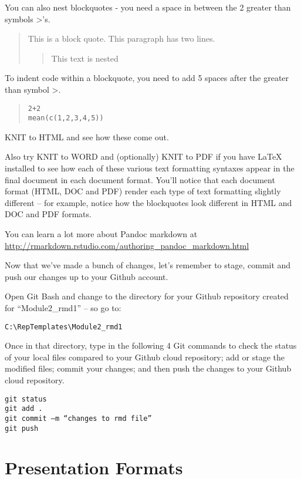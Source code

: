 \documentclass[
]{book}
\begin{document}
You can also nest blockquotes - you need a space in between the 2 greater than symbols \textgreater's.

\begin{quote}
This is a block quote. This
paragraph has two lines.

\begin{quote}
This text is nested
\end{quote}
\end{quote}

To indent code within a blockquote, you need to add 5 spaces after the greater than symbol \textgreater.

\begin{quote}
\begin{verbatim}
2+2
mean(c(1,2,3,4,5))
\end{verbatim}
\end{quote}

KNIT to HTML and see how these come out.

Also try KNIT to WORD and (optionally) KNIT to PDF if you have LaTeX installed to see how each of these various text formatting syntaxes appear in the final document in each document format. You'll notice that each document format (HTML, DOC and PDF) render each type of text formatting slightly different -- for example, notice how the blockquotes look different in HTML and DOC and PDF formats.

You can learn a lot more about Pandoc markdown at \url{http://rmarkdown.rstudio.com/authoring_pandoc_markdown.html}

Now that we've made a bunch of changes, let's remember to stage, commit and push our changes up to your Github account.

Open Git Bash and change to the directory for your Github repository created for ``Module2\_rmd1'' -- so go to:

\texttt{C:\textbackslash{}RepTemplates\textbackslash{}Module2\_rmd1}

Once in that directory, type in the following 4 Git commands to check the status of your local files compared to your Github cloud repository; add or stage the modified files; commit your changes; and then push the changes to your Github cloud repository.

\begin{verbatim}
git status
git add .
git commit –m “changes to rmd file”
git push
\end{verbatim}

\hypertarget{presentations}{%
\chapter{Presentation Formats}\label{presentations}}
\end{document}
